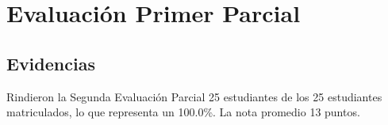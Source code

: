 \chapter{Evaluación Primer Parcial}
\newpage


%
%

\pagestyle{empty} %

\section{Evidencias}
Rindieron la Segunda Evaluación Parcial 25 estudiantes de los 25 estudiantes matriculados, lo que representa un 100.0\%.
La nota promedio 13 puntos.


